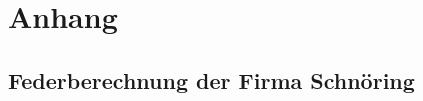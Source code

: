 \section{Anhang}
\label{sec:anhang}
\subsection{Federberechnung der Firma Schnöring}
\begin{center}
\end{center}
